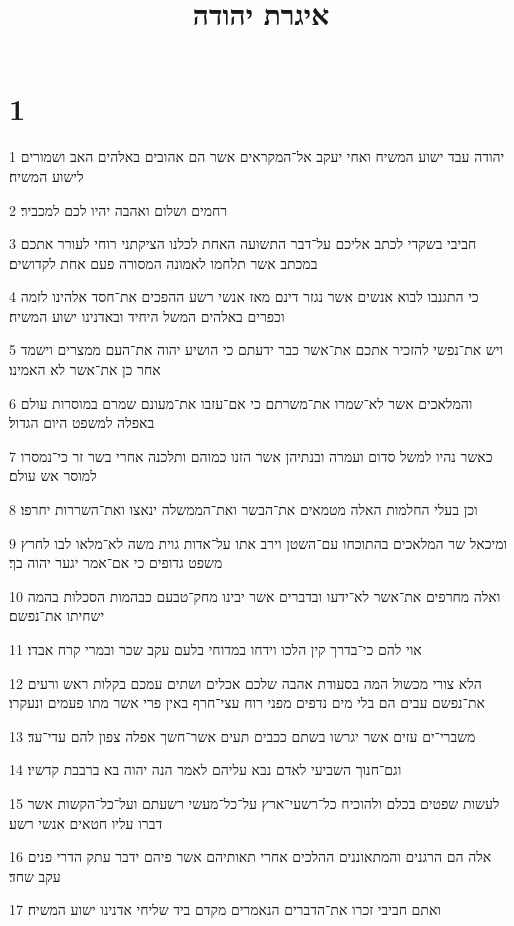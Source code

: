 

\title{איגרת יהודה}


\chapter{1}

\par 1 יהודה עבד ישוע המשיח ואחי יעקב אל־המקראים אשר הם אהובים באלהים האב ושמורים לישוע המשיח׃
\par 2 רחמים ושלום ואהבה יהיו לכם למכביר׃
\par 3 חביבי בשקדי לכתב אליכם על־דבר התשועה האחת לכלנו הציקתני רוחי לעורר אתכם במכתב אשר תלחמו לאמונה המסורה פעם אחת לקדושים׃
\par 4 כי התגנבו לבוא אנשים אשר נגזר דינם מאז אנשי רשע ההפכים את־חסד אלהינו לזמה וכפרים באלהים המשל היחיד ובאדנינו ישוע המשיח׃
\par 5 ויש את־נפשי להזכיר אתכם את־אשר כבר ידעתם כי הושיע יהוה את־העם ממצרים וישמד אחר כן את־אשר לא האמינו׃
\par 6 והמלאכים אשר לא־שמרו את־משרתם כי אם־עזבו את־מעונם שמרם במוסרות עולם באפלה למשפט היום הגדול׃
\par 7 כאשר נהיו למשל סדום ועמרה ובנתיהן אשר הזנו כמוהם ותלכנה אחרי בשר זר כי־נמסרו למוסר אש עולם׃
\par 8 וכן בעלי החלמות האלה מטמאים את־הבשר ואת־הממשלה ינאצו ואת־השררות יחרפו׃
\par 9 ומיכאל שר המלאכים בהתוכחו עם־השטן וירב אתו על־אדות גוית משה לא־מלאו לבו לחרץ משפט גדופים כי אם־אמר יגער יהוה בך׃
\par 10 ואלה מחרפים את־אשר לא־ידעו ובדברים אשר יבינו מחק־טבעם כבהמות הסכלות בהמה ישחיתו את־נפשם׃
\par 11 אוי להם כי־בדרך קין הלכו וידחו במדוחי בלעם עקב שכר ובמרי קרח אבדו׃
\par 12 הלא צורי מכשול המה בסעודת אהבה שלכם אכלים ושתים עמכם בקלות ראש ורעים את־נפשם עבים הם בלי מים נדפים מפני רוח עצי־חרף באין פרי אשר מתו פעמים ונעקרו׃
\par 13 משברי־ים עזים אשר יגרשו בשתם ככבים תעים אשר־חשך אפלה צפון להם עדי־עד׃
\par 14 וגם־חנוך השביעי לאדם נבא עליהם לאמר הנה יהוה בא ברבבת קדשיו׃
\par 15 לעשות שפטים בכלם ולהוכיח כל־רשעי־ארץ על־כל־מעשי רשעתם ועל־כל־הקשות אשר דברו עליו חטאים אנשי רשע׃
\par 16 אלה הם הרגנים והמתאוננים ההלכים אחרי תאותיהם אשר פיהם ידבר עתק הדרי פנים עקב שחד׃
\par 17 ואתם חביבי זכרו את־הדברים הנאמרים מקדם ביד שליחי אדנינו ישוע המשיח׃
